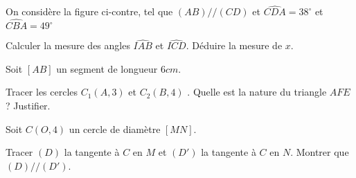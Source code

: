 \documentclass[a4paper,addpoints,12pt]{exam}
\begin{document}
\begin{exo}[6]
\begin{minipage}{.5\linewidth}
On considère la figure ci-contre, tel que $(AB)//(CD)$ et $\widehat{CDA}=38^{\circ}$ et $\widehat{CBA}=49^{\circ}$
\begin{questions}
\question[4] Calculer la mesure des angles $\widehat{IAB}$ et $\widehat{ICD}$.\newline
\anserline[2]
\question[2] Déduire la mesure de $x$.\newline
\anserline[2]
\end{questions}
\end{minipage}%
\begin{minipage}{.5\linewidth}
\end{minipage}

\end{exo}

\begin{exo}[6]
Soit $[AB]$ un segment de longueur $6cm$.
\begin{questions}
\question Tracer les cercles $C_1(A,3)$ et $C_2(B,4)$ .
\question Quelle est la nature du triangle $AFE$? Justifier.
\end{questions}
\end{exo}

\begin{exo}[6]
Soit $C(O,4)$ un cercle de diamètre $[MN]$.
\begin{questions}
\question Tracer $(D)$ la tangente à $C$ en $M$ et $(D')$ la tangente à $C$ en $N$.
\question Montrer que $(D)//(D')$.
\end{questions}
\end{exo}
\end{document}
